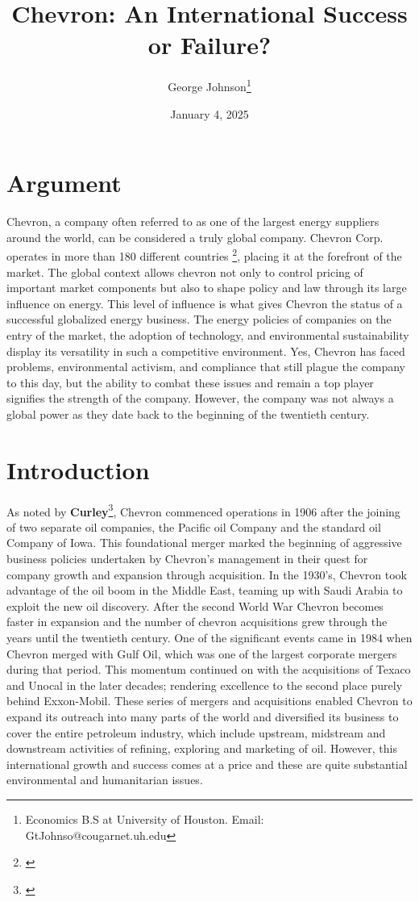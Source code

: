 \documentclass[12pt,letterpaper]{article}
\begin{document}
    \title{\textbf{Chevron: An International Success or Failure?}}
    \author{George Johnson\footnote{Economics B.S at University of Houston. Email: GtJohnso@cougarnet.uh.edu}}
\date{January 4, 2025}
\maketitle
\newpage

\section{Argument}
    Chevron, a company often referred to as one of the largest energy suppliers around the world, can be considered a truly global company. Chevron Corp. operates in more than 180 different countries \footnote{\cite{Statista}}, placing it at the forefront of the market. The global context allows chevron not only to control pricing of important market components but also to shape policy and law through its large influence on energy. This level of influence is what gives Chevron the status of a successful globalized energy business. The energy policies of companies on the entry of the market, the adoption of technology, and environmental sustainability display its versatility in such a competitive environment. Yes, Chevron has faced problems, environmental activism, and compliance that still plague the company to this day, but the ability to combat these issues and remain a top player signifies the strength of the company. However, the company was not always a global power as they date back to the beginning of the twentieth century.

\section{Introduction}
    As noted by \textbf{Curley}\footnote{\cite{Curley}}, Chevron commenced operations in 1906 after the joining of two separate oil companies, the Pacific oil Company and the standard oil Company of Iowa. This foundational merger marked the beginning of aggressive business policies undertaken by Chevron’s management in their quest for company growth and expansion through acquisition. In the 1930's, Chevron took advantage of the oil boom in the Middle East, teaming up with Saudi Arabia to exploit the new oil discovery. After the second World War Chevron becomes faster in expansion and the number of chevron acquisitions grew through the years until the twentieth century. One of the significant events came in 1984 when Chevron merged with Gulf Oil, which was one of the largest corporate mergers during that period. This momentum continued on with the acquisitions of Texaco and Unocal in the later decades; rendering excellence to the second place purely behind Exxon-Mobil. These series of mergers and acquisitions enabled Chevron to expand its outreach into many parts of the world and diversified its business to cover the entire petroleum industry, which include upstream, midstream and downstream activities of refining, exploring and marketing of oil. However, this international growth and success comes at a price and these are quite substantial environmental and humanitarian issues.
    
\end{document}
